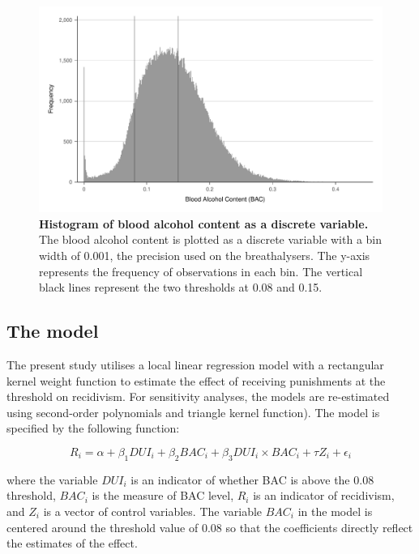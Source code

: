 \documentclass[
  11pt,
]{article}
\begin{document}
\begin{figure}[H]
  \centering
  \includegraphics[width=0.9\columnwidth]{../figures/bac_histogram_discrete.pdf}
  \caption{\textbf{Histogram of blood alcohol content as a discrete variable.} The blood alcohol content is plotted as a discrete variable with a bin width of 0.001, the precision used on the breathalysers. The y-axis represents the frequency of observations in each bin. The vertical black lines represent the two thresholds at 0.08 and 0.15.}
  \label{fig:bac_hist_discrete}
\end{figure}

\hypertarget{the-model}{%
\subsection{The model}\label{the-model}}

The present study utilises a local linear regression model with a
rectangular kernel weight function to estimate the effect of receiving
punishments at the threshold on recidivism. For sensitivity analyses,
the models are re-estimated using second-order polynomials and triangle
kernel function). The model is specified by the following function:

\begin{equation}
  \label{eqn:model}
  R_i = \alpha + \beta_1 DUI_i + \beta_2 BAC_i + \beta_3 DUI_i \times BAC_i + \tau Z_i + \epsilon_i
\end{equation}

where the variable \(DUI_i\) is an indicator of whether BAC is above the
0.08 threshold, \(BAC_i\) is the measure of BAC level, \(R_i\) is an
indicator of recidivism, and \(Z_i\) is a vector of control variables.
The variable \(BAC_i\) in the model is centered around the threshold
value of 0.08 so that the coefficients directly reflect the estimates of
the effect.
\end{document}
